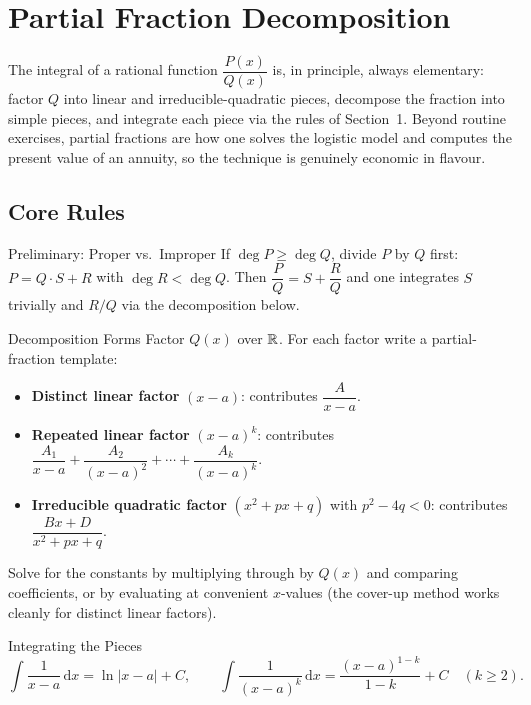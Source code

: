 \chapter{Partial Fraction Decomposition}

The integral of a rational function $\dfrac{P(x)}{Q(x)}$ is, in
principle, always elementary: factor $Q$ into linear and
irreducible-quadratic pieces, decompose the fraction into simple pieces, and integrate each piece via the rules of
Section~1. Beyond routine exercises, partial fractions are how one solves
the logistic model and computes the present value of an annuity, so the
technique is genuinely economic in flavour.

\section{Core Rules}

\begin{rulebox}{Preliminary: Proper vs.\ Improper}
If $\deg P \geq \deg Q$, divide $P$ by $Q$ first: $P=Q\cdot S+R$ with
$\deg R < \deg Q$. Then $\dfrac{P}{Q}=S+\dfrac{R}{Q}$ and one integrates
$S$ trivially and $R/Q$ via the decomposition below.
\end{rulebox}

\begin{rulebox}{Decomposition Forms}
Factor $Q(x)$ over $\mathbb{R}$. For each factor write a partial-fraction
template:
\begin{itemize}[leftmargin=1.6em,itemsep=0.3ex]
  \item \textbf{Distinct linear factor} $(x-a)$: contributes
        $\dfrac{A}{x-a}$.
  \item \textbf{Repeated linear factor} $(x-a)^{k}$: contributes
        $\dfrac{A_{1}}{x-a}+\dfrac{A_{2}}{(x-a)^{2}}+\cdots
         +\dfrac{A_{k}}{(x-a)^{k}}$.
  \item \textbf{Irreducible quadratic factor} $(x^{2}+px+q)$ with
        $p^{2}-4q<0$: contributes $\dfrac{Bx+D}{x^{2}+px+q}$.
\end{itemize}
Solve for the constants by multiplying through by $Q(x)$ and comparing
coefficients, or by evaluating at convenient $x$-values (the cover-up
method works cleanly for distinct linear factors).
\end{rulebox}

\begin{rulebox}{Integrating the Pieces}
\[
  \int \frac{1}{x-a}\,\mathrm{d}x = \ln|x-a|+C, \qquad
  \int \frac{1}{(x-a)^{k}}\,\mathrm{d}x = \frac{(x-a)^{1-k}}{1-k}+C
    \quad (k\geq 2) .
\]
\end{rulebox}

